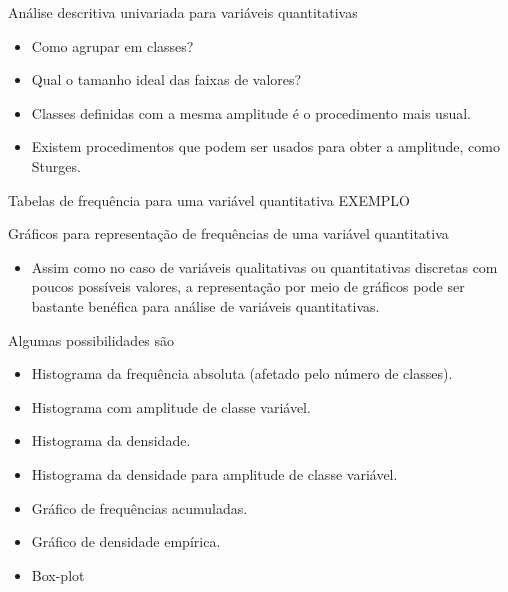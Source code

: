 \documentclass[
  ignorenonframetext,
  serif,
  professionalfont,
  usenames,
  dvipsnames,
  aspectratio = 169]{beamer}
\providecommand{\tightlist}{%
  \setlength{\itemsep}{0pt}\setlength{\parskip}{0pt}}
\renewcommand{\tightlist}{%
  \setlength{\itemsep}{0\baselineskip}
  \setlength{\parskip}{0.25\baselineskip}
}
\begin{document}
\begin{frame}{Análise descritiva univariada para variáveis
quantitativas}
\protect\hypertarget{anuxe1lise-descritiva-univariada-para-variuxe1veis-quantitativas-3}{}
\begin{itemize}
\item
  Como agrupar em classes?
\item
  Qual o tamanho ideal das faixas de valores?
\item
  Classes definidas com a mesma amplitude é o procedimento mais usual.
\item
  Existem procedimentos que podem ser usados para obter a amplitude,
  como Sturges.
\end{itemize}
\end{frame}

\begin{frame}{Tabelas de frequência para uma variável quantitativa}
\protect\hypertarget{tabelas-de-frequuxeancia-para-uma-variuxe1vel-quantitativa}{}
EXEMPLO
\end{frame}

\begin{frame}{Gráficos para representação de frequências de uma variável
quantitativa}
\protect\hypertarget{gruxe1ficos-para-representauxe7uxe3o-de-frequuxeancias-de-uma-variuxe1vel-quantitativa}{}
\begin{itemize}
\tightlist
\item
  Assim como no caso de variáveis qualitativas ou quantitativas
  discretas com poucos possíveis valores, a representação por meio de
  gráficos pode ser bastante benéfica para análise de variáveis
  quantitativas.
\end{itemize}

Algumas possibilidades são

\begin{itemize}
\tightlist
\item
  Histograma da frequência absoluta (afetado pelo número de classes).
\item
  Histograma com amplitude de classe variável.
\item
  Histograma da densidade.
\item
  Histograma da densidade para amplitude de classe variável.
\item
  Gráfico de frequências acumuladas.
\item
  Gráfico de densidade empírica.
\item
  Box-plot
\end{itemize}
\end{frame}
\end{document}
